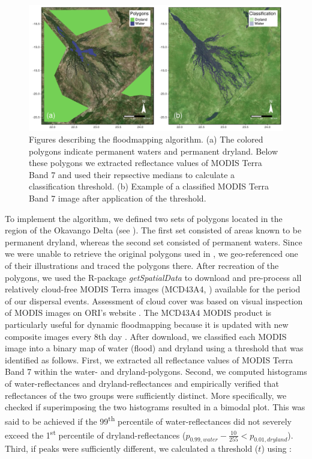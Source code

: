 \documentclass[abstract=on,10pt,a4paper,bibliography=totocnumbered]{scrartcl}
\begin{document}
\begin{figure}[h]
  \begin{center}
    \includegraphics[width = \textwidth]{99_Floodmapping.pdf}
    \caption{Figures describing the floodmapping algorithm. (a) The colored
    polygons indicate permanent waters and permanent dryland. Below these
    polygons we extracted reflectance values of MODIS Terra Band 7 and used
    their repsective medians to calculate a classification threshold. (b)
    Example of a classified MODIS Terra Band 7 image after application of the
    threshold.}
    \label{Floodmapping}
  \end{center}
\end{figure}

To implement the algorithm, we defined two sets of polygons located in the
region of the Okavango Delta (see ). The first set consisted
of areas known to be permanent dryland, whereas the second set consisted of
permanent waters. Since we were unable to retrieve the original polygons used in
\cite{Wolski.2017}, we geo-referenced one of their illustrations and traced the
polygons there. After recreation of the polygons, we used the R-package
\textit{getSpatialData} \citep{Schwalb.2018} to download and pre-process all
relatively cloud-free MODIS Terra images (MCD43A4, \cite{Schaaf.2015}) available
for the period of our dispersal events. Assessment of cloud cover was based on
visual inspection of MODIS images on ORI's website \citep{ORI.2019}. The MCD43A4
MODIS product is particularly useful for dynamic floodmapping because it is
updated with new composite images every 8th day \citep{Wolski.2017}. After
download, we classified each MODIS image into a binary map of water (flood) and
dryland using a threshold that was identified as follows. First, we extracted
all reflectance values of MODIS Terra Band 7 within the water- and
dryland-polygons. Second, we computed histograms of water-reflectances and
dryland-reflectances and empirically verified that reflectances of the two
groups were sufficiently distinct. More specifically, we checked if
superimposing the two histograms resulted in a bimodal plot. This was said to be
achieved if the 99\textsuperscript{th} percentile of water-reflectances did not
severely exceed the 1\textsuperscript{st} percentile of dryland-reflectances
(\(p_{0.99, water} - \frac{10}{255} < p_{0.01, dryland}\)). Third, if peaks were
sufficiently different, we calculated a threshold (\(t\)) using :
\end{document}

